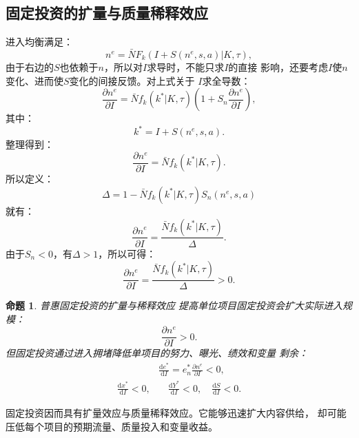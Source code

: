 \documentclass[UTF8, a4paper, 12pt, fontset=fandol]{ctexart}
\newtheorem{proposition}[theorem]{命题}
\theoremstyle{definition}
\theoremstyle{remark}
\begin{document}
\subsection{固定投资的扩量与质量稀释效应}
进入均衡满足：
\begin{equation*}
  n^e = \bar{N}F_k(I+S(n^e,s,a)|K,\tau),
\end{equation*}
由于右边的$S$也依赖于$n$，所以对$I$求导时，不能只求$I$的直接
影响，还要考虑$I$使$n$变化、进而使$S$变化的间接反馈。对上式关于
$I$求全导数：
\begin{equation*}
  \frac{\partial n^e}{\partial I}=\bar{N}f_k(k^*|K,\tau)
  \left ( 1+S_n\frac{\partial n^e}{\partial I} \right ),
\end{equation*}
其中：
\begin{equation*}
  k^* = I + S(n^e,s,a).
\end{equation*}
整理得到：
\begin{equation*}
  [1-\bar{N}f_k(k^*|K,\tau)S_n]\frac{\partial n^e}{\partial I}
  =\bar{N}f_k(k^*|K,\tau).
\end{equation*}
所以定义：
\begin{equation*}
  \Delta = 1 - \bar{N}f_k(k^*|K,\tau)S_n(n^e,s,a)
\end{equation*}
就有：
\begin{equation*}
  \frac{\partial n^e}{\partial I} =
  \frac{\bar{N}f_k(k^*|K,\tau)}{\Delta}.
\end{equation*}
由于$S_n < 0$，有$\Delta > 1$，所以可得：
\begin{equation*}
  \frac{\partial n^e}{\partial I} =
  \frac{\bar{N}f_k(k^*|K,\tau)}{\Delta}>0.
\end{equation*}

\begin{proposition}{普惠固定投资的扩量与稀释效应}
  提高单位项目固定投资会扩大实际进入规模：
  \begin{equation*}
    \frac{\partial n^e}{\partial I}>0.
  \end{equation*}
  但固定投资通过进入拥堵降低单项目的努力、曝光、绩效和变量
  剩余：
  \begin{align*}
    &\frac{\mathrm{d}e^*}{\mathrm{d}I}=e_n^*\frac{\partial n^e}{\partial I}<0,\\
    \frac{\mathrm{d} x^*}{\mathrm{d} I}<0,&\quad
    \frac{\mathrm{d} Y^*}{\mathrm{d} I}<0,\quad
    \frac{\mathrm{d} S}{\mathrm{d} I}<0.
  \end{align*}
\end{proposition}
固定投资因而具有扩量效应与质量稀释效应。它能够迅速扩大内容供给，
却可能压低每个项目的预期流量、质量投入和变量收益。
\end{document}
